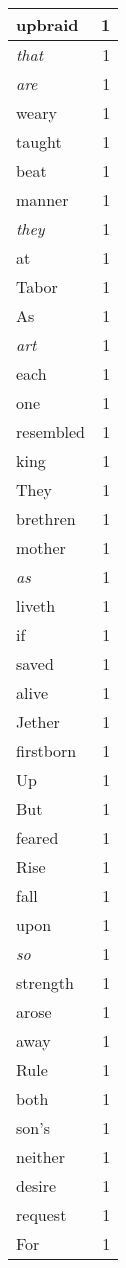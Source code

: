 \begin{center}
\begin{longtable}{l|r}
upbraid & 1\\ \hline 
\emph{that} & 1\\ \hline 
\emph{are} & 1\\ \hline 
weary & 1\\ \hline 
taught & 1\\ \hline 
beat & 1\\ \hline 
manner & 1\\ \hline 
\emph{they} & 1\\ \hline 
at & 1\\ \hline 
Tabor & 1\\ \hline 
As & 1\\ \hline 
\emph{art} & 1\\ \hline 
each & 1\\ \hline 
one & 1\\ \hline 
resembled & 1\\ \hline 
king & 1\\ \hline 
They & 1\\ \hline 
brethren & 1\\ \hline 
mother & 1\\ \hline 
\emph{as} & 1\\ \hline 
liveth & 1\\ \hline 
if & 1\\ \hline 
saved & 1\\ \hline 
alive & 1\\ \hline 
Jether & 1\\ \hline 
firstborn & 1\\ \hline 
Up & 1\\ \hline 
But & 1\\ \hline 
feared & 1\\ \hline 
Rise & 1\\ \hline 
fall & 1\\ \hline 
upon & 1\\ \hline 
\emph{so} & 1\\ \hline 
strength & 1\\ \hline 
arose & 1\\ \hline 
away & 1\\ \hline 
Rule & 1\\ \hline 
both & 1\\ \hline 
son's & 1\\ \hline 
neither & 1\\ \hline 
desire & 1\\ \hline 
request & 1\\ \hline 
For & 1\\ \hline 

\end{longtable}
\end{center}
